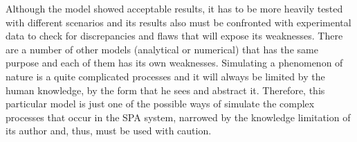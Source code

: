 Although the model showed acceptable results, it has to be more heavily tested with different scenarios and its results also must be confronted with experimental data to check for discrepancies and flaws that will expose its weaknesses.
There are a number of other models (analytical or numerical) that has the same purpose and each of them has its own weaknesses.
Simulating a phenomenon of nature is a quite complicated processes and it will always be limited by the human knowledge, by the form that he sees and abstract it.
Therefore, this particular model is just one of the possible ways of simulate the complex processes that occur in the SPA system, narrowed by the knowledge limitation of its author and, thus, must be used with caution.

% 
%
%
%


